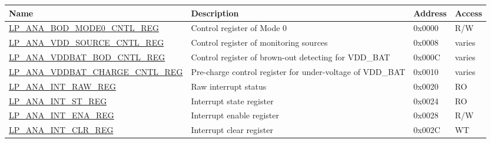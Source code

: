 \begin{longtable}{ | p{6cm} | p{7.2cm} | p{1.3cm} | p{1cm} | }
\hline\rowcolor{lightgray}
Name & Description &  Address & Access \\ \hline
\endhead
\hyperref[regdesc:LPANABODMODE0CNTLREG]{LP\_ANA\_BOD\_MODE0\_CNTL\_REG} & Control register of Mode 0 & 0x0000 & R/W \\ \hline
\hyperref[regdesc:LPANAVDDSOURCECNTLREG]{LP\_ANA\_VDD\_SOURCE\_CNTL\_REG} & Control register of monitoring sources & 0x0008 & varies \\ \hline
\hyperref[regdesc:LPANAVDDBATBODCNTLREG]{LP\_ANA\_VDDBAT\_BOD\_CNTL\_REG} & Control register of brown-out detecting for VDD\_BAT & 0x000C & varies \\ \hline
\hyperref[regdesc:LPANAVDDBATCHARGECNTLREG]{LP\_ANA\_VDDBAT\_CHARGE\_CNTL\_REG} & Pre-charge control register for under-voltage of VDD\_BAT & 0x0010 & varies \\ \hline
\hyperref[regdesc:LPANAINTRAWREG]{LP\_ANA\_INT\_RAW\_REG} & Raw interrupt status & 0x0020 & RO \\ \hline
\hyperref[regdesc:LPANAINTSTREG]{LP\_ANA\_INT\_ST\_REG} & Interrupt state register & 0x0024 & RO \\ \hline
\hyperref[regdesc:LPANAINTENAREG]{LP\_ANA\_INT\_ENA\_REG} & Interrupt enable register & 0x0028 & R/W \\ \hline
\hyperref[regdesc:LPANAINTCLRREG]{LP\_ANA\_INT\_CLR\_REG} & Interrupt clear register & 0x002C & WT \\ \hline
\end{longtable}